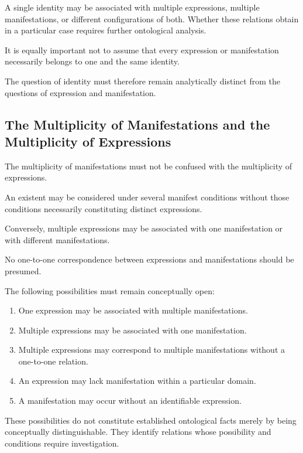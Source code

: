 A single identity may be associated with multiple expressions,
multiple manifestations, or different configurations
of both. Whether these relations obtain in a particular
case requires further ontological analysis.

It is equally important not to assume that every expression
or manifestation necessarily belongs to one and the same
identity.

The question of identity must therefore remain analytically
distinct from the questions of expression and manifestation.

\subsection{The Multiplicity of Manifestations and the Multiplicity of Expressions}

The multiplicity of manifestations must not be confused
with the multiplicity of expressions.

An existent may be considered under several manifest
conditions without those conditions necessarily constituting
distinct expressions.

Conversely, multiple expressions may be associated with
one manifestation or with different manifestations.

No one-to-one correspondence between expressions and
manifestations should be presumed.

The following possibilities must remain conceptually open:

\begin{enumerate}
    \item One expression may be associated with multiple
    manifestations.

    \item Multiple expressions may be associated with
    one manifestation.

    \item Multiple expressions may correspond to multiple
    manifestations without a one-to-one relation.

    \item An expression may lack manifestation within
    a particular domain.

    \item A manifestation may occur without an identifiable
    expression.
\end{enumerate}

These possibilities do not constitute established ontological
facts merely by being conceptually distinguishable. They
identify relations whose possibility and conditions require
investigation.

